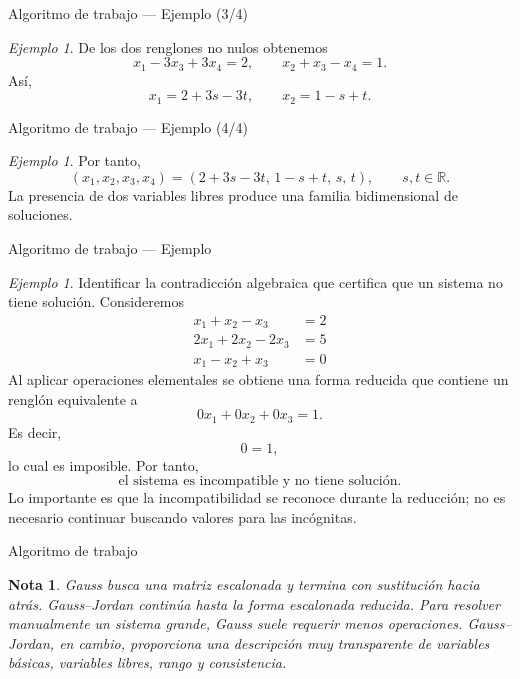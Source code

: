 \documentclass[aspectratio=169,11pt]{beamer}
\newtheorem{Nota}[definicion]{Nota}
\theoremstyle{remark}
\newtheorem{Ejem}[definicion]{Ejemplo}
\newcommand{\R}{\mathbb{R}}
\begin{document}
\begin{frame}{Algoritmo de trabajo — Ejemplo (3/4)}
\begin{Ejem}
De los dos renglones no nulos obtenemos
\[
x_1-3x_3+3x_4=2,\qquad x_2+x_3-x_4=1.
\]
Así,
\[
x_1=2+3s-3t,\qquad x_2=1-s+t.
\]
\end{Ejem}
\end{frame}

\begin{frame}{Algoritmo de trabajo — Ejemplo (4/4)}
\begin{Ejem}
Por tanto,
\[
\boxed{(x_1,x_2,x_3,x_4)=(2+3s-3t,\,1-s+t,\,s,\,t),\qquad s,t\in\R.}
\]
La presencia de dos variables libres produce una familia bidimensional de soluciones.
\end{Ejem}
\end{frame}

\begin{frame}[shrink=5]{Algoritmo de trabajo — Ejemplo}
\footnotesize
\begin{Ejem}

Identificar la contradicción algebraica que certifica que un sistema no tiene solución. Consideremos
\[
\begin{aligned}
x_{1} + x_{2} - x_{3} &= 2\\
2 x_{1} + 2 x_{2} - 2 x_{3} &= 5\\
x_{1} - x_{2} + x_{3} &= 0
\end{aligned}
\]
Al aplicar operaciones elementales se obtiene una forma reducida que contiene un renglón equivalente a
\[
0x_1+0x_2+0x_3=1.
\]
Es decir,
\[
0=1,
\]
lo cual es imposible. Por tanto,
\[
\boxed{\text{el sistema es incompatible y no tiene solución}.}
\]
Lo importante es que la incompatibilidad se reconoce durante la reducción; no es necesario continuar buscando valores para las incógnitas.
\end{Ejem}
\end{frame}

\begin{frame}[shrink=5]{Algoritmo de trabajo}
\footnotesize
\begin{Nota}

Gauss busca una matriz escalonada y termina con sustitución hacia atrás. Gauss--Jordan continúa hasta la forma escalonada reducida. Para resolver manualmente un sistema grande, Gauss suele requerir menos operaciones. Gauss--Jordan, en cambio, proporciona una descripción muy transparente de variables básicas, variables libres, rango y consistencia.
\end{Nota}
\end{frame}
\end{document}

